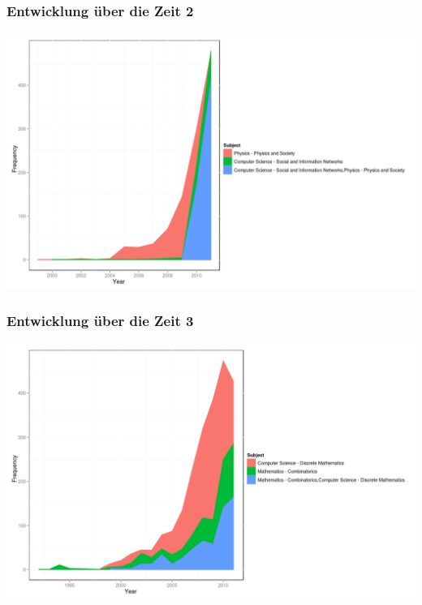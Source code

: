 \documentclass[12pt, xcolor=table]{beamer}
\begin{document}
\begin{frame}
	\frametitle{Entwicklung über die Zeit 2}
	\begin{center}
		\includegraphics[scale=0.4]{../../visual/trend/csph.png}
	\end{center}
\end{frame}
\begin{frame}
	\frametitle{Entwicklung über die Zeit 3}
	\begin{center}
		\includegraphics[scale=0.4]{../../visual/trend/combcs.png}
	\end{center}
\end{frame}
\end{document}
